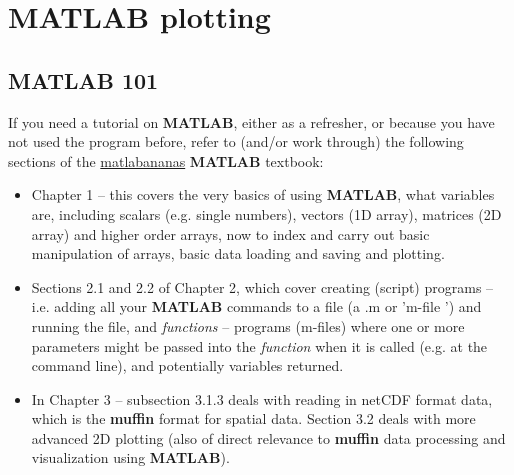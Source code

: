 \documentclass[11pt,fleqn]{book} %
\begin{document}

\newpage


\section{MATLAB plotting}


\subsection{MATLAB 101}

If you need a tutorial on \textbf{MATLAB}, either as a refresher, or because you have not used the program before, refer to (and/or work through) the following sections of the \href{https://github.com/derpycode/matlabananas\#matlabananas}{matlabananas} \textbf{MATLAB} textbook:

\vspace{2pt}
\begin{itemize}
\vspace{1pt}
\item Chapter 1 --  this covers the very basics of using \textbf{MATLAB}, what variables are, including scalars (e.g. single numbers), vectors (1D array), matrices (2D array) and higher order arrays, now to index and carry out basic manipulation of arrays, basic data loading and saving and plotting.
\vspace{1pt}
\item Sections 2.1 and 2.2 of Chapter 2, which cover creating (script) programs -- i.e. adding all your \textbf{MATLAB} commands to a file (a \footnotesize\textsf{.m }\normalsize or '\footnotesize\textsf{m-file }\normalsize') and running the file, and \textit{functions} -- programs (\footnotesize\textsf{m-file}\normalsize s) where one or more parameters might be passed into the \textit{function} when it is called (e.g. at the command line), and potentially variables returned.
\vspace{1pt}
\item In Chapter 3 -- subsection 3.1.3 deals with reading in netCDF format data, which is the \textbf{muffin} format for spatial data. Section 3.2 deals with more advanced 2D plotting (also of direct relevance to \textbf{muffin} data processing and visualization using \textbf{MATLAB}).
\end{itemize}
\vspace{2pt}
\end{document}
